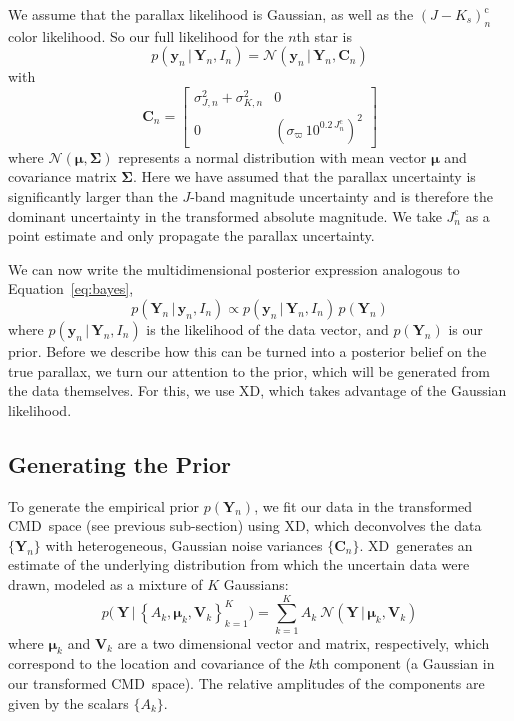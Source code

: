 \documentclass[modern]{aastex61}
\newcommand{\acronym}[1]{{\small{#1}}}
\newcommand{\xd}{\acronym{XD}}
\newcommand{\cmd}{\acronym{CMD}}
\newcommand{\given}{\,|\,}
\newcommand{\corr}{\mathrm{c}}
\renewcommand{\vec}[1]{\boldsymbol{{#1}}}
\newcommand{\truth}{\vec{Y}}
\newcommand{\data}{\vec{y}}
\newcommand{\mean}{\vec{\mu}}
\newcommand{\mat}[1]{{\mathbf{{#1}}}}
\newcommand{\var}{\mat{V}}
\newcommand{\covar}{\mat{C}}
\begin{document}
We assume that the parallax likelihood is Gaussian, as well as the $(J-K_s)^{\corr}_n$ color likelihood. So our full likelihood for the $n$th star is
\begin{equation}
p(\data_n \given \truth_n, I_n) = \mathcal{N}(\data_n \given \truth_n, \covar_n)
\end{equation}
with \\
\[
\covar_n = \begin{bmatrix}
\sigma_{J,n}^2 + \sigma_{K,n}^2 & 0 \\
0 & \left(\sigma_{\varpi}\,10^{0.2\,J_n^{\corr}}\right)^2
\end{bmatrix}
\]
where $\mathcal{N}(\mean, \mat{\Sigma})$ represents a normal distribution with
mean vector $\mean$ and covariance matrix $\mat{\Sigma}$.
Here we have assumed that the parallax uncertainty is significantly larger than the $J$-band magnitude uncertainty and is therefore the dominant uncertainty in the transformed absolute magnitude. We take $J_n^{\corr}$ as a point estimate and only propagate the parallax uncertainty.

We can now write the multidimensional posterior expression analogous to Equation~\ref{eq:bayes},
\begin{equation}
p(\truth_n \given \data_n, I_n) \propto p(\data_n \given \truth_n, I_n) \, p(\truth_n) \label{eq:posterior}
\end{equation}
where $p(\data_n \given \truth_n, I_n)$ is the likelihood of the data vector, and $p(\truth_n)$ is our prior.
Before we describe how this can be turned into a posterior belief on the true parallax, we turn our attention to the prior, which will be generated from the data themselves. For this, we use XD, which takes advantage of the Gaussian likelihood.

\subsection{Generating the Prior}

To generate the empirical prior $p(\truth_n)$,
we fit our data in the transformed \cmd\ space (see previous sub-section) using \xd,
which deconvolves the data $\{ \truth_n \}$ with heterogeneous,
Gaussian noise variances $\{ \covar_n\}$. \xd\ generates an estimate of the underlying distribution from which the uncertain data were drawn, modeled as a mixture of $K$ Gaussians:
\begin{equation}
	p\bigl(\ \truth \given  \left\{A_k, \mean_k, \var_k\right\}_{k=1}^K \bigr) = \sum_{k=1}^K A_k \ \mathcal{N}(\truth \given \mean_k, \var_k )
\end{equation}
where $\mean_k$ and $\var_k$ are a two dimensional vector and matrix, respectively, which correspond to the location and covariance of the $k$th component (a Gaussian in our transformed \cmd\ space). The relative amplitudes of the components are given by the scalars $\{ A_k \}$.
\end{document}
